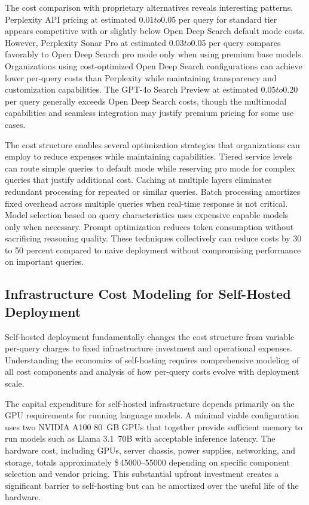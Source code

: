 The cost comparison with proprietary alternatives reveals interesting patterns. Perplexity API pricing at estimated $0.01 to $0.05 per query for standard tier appears competitive with or slightly below Open Deep Search default mode costs. However, Perplexity Sonar Pro at estimated $0.03 to $0.05 per query compares favorably to Open Deep Search pro mode only when using premium base models. Organizations using cost-optimized Open Deep Search configurations can achieve lower per-query costs than Perplexity while maintaining transparency and customization capabilities. The GPT-4o Search Preview at estimated $0.05 to $0.20 per query generally exceeds Open Deep Search costs, though the multimodal capabilities and seamless integration may justify premium pricing for some use cases.

The cost structure enables several optimization strategies that organizations can employ to reduce expenses while maintaining capabilities. Tiered service levels can route simple queries to default mode while reserving pro mode for complex queries that justify additional cost. Caching at multiple layers eliminates redundant processing for repeated or similar queries. Batch processing amortizes fixed overhead across multiple queries when real-time response is not critical. Model selection based on query characteristics uses expensive capable models only when necessary. Prompt optimization reduces token consumption without sacrificing reasoning quality. These techniques collectively can reduce costs by 30 to 50 percent compared to naive deployment without compromising performance on important queries.

\subsection{Infrastructure Cost Modeling for Self-Hosted Deployment}

Self-hosted deployment fundamentally changes the cost structure from variable per-query charges to fixed infrastructure investment and operational expenses. Understanding the economics of self-hosting requires comprehensive modeling of all cost components and analysis of how per-query costs evolve with deployment scale.

The capital expenditure for self-hosted infrastructure depends primarily on the GPU requirements for running language models. A minimal viable configuration uses two NVIDIA A100 80~GB GPUs that together provide sufficient memory to run models such as Llama 3.1~70B with acceptable inference latency. The hardware cost, including GPUs, server chassis, power supplies, networking, and storage, totals approximately \$\,\numrange{45000}{55000} depending on specific component selection and vendor pricing. This substantial upfront investment creates a significant barrier to self-hosting but can be amortized over the useful life of the hardware.


